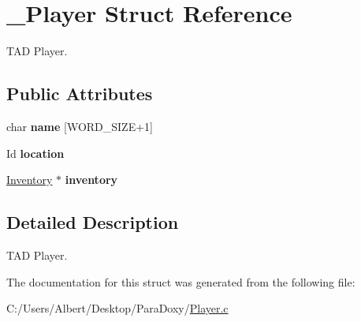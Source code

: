 \hypertarget{struct___player}{\section{\-\_\-\-Player Struct Reference}
\label{struct___player}
}


T\-A\-D Player.  


\subsection*{Public Attributes}
\begin{DoxyCompactItemize}
\item 
\hypertarget{struct___player_ac89715f913cc607b75eb7236765c41f5}{char {\bfseries name} \mbox{[}W\-O\-R\-D\-\_\-\-S\-I\-Z\-E+1\mbox{]}}\label{struct___player_ac89715f913cc607b75eb7236765c41f5}

\item 
\hypertarget{struct___player_adbb6195d15b88f3f658e74274eff52d8}{Id {\bfseries location}}\label{struct___player_adbb6195d15b88f3f658e74274eff52d8}

\item 
\hypertarget{struct___player_a5e02924cb82ca61f74ba414d190aa29b}{\hyperlink{struct___inventory}{Inventory} $\ast$ {\bfseries inventory}}\label{struct___player_a5e02924cb82ca61f74ba414d190aa29b}

\end{DoxyCompactItemize}


\subsection{Detailed Description}
T\-A\-D Player. 


\begin{DoxyItemize}
\item 
\end{DoxyItemize}

The documentation for this struct was generated from the following file\-:\begin{DoxyCompactItemize}
\item 
C\-:/\-Users/\-Albert/\-Desktop/\-Para\-Doxy/\hyperlink{_player_8c}{Player.\-c}\end{DoxyCompactItemize}

